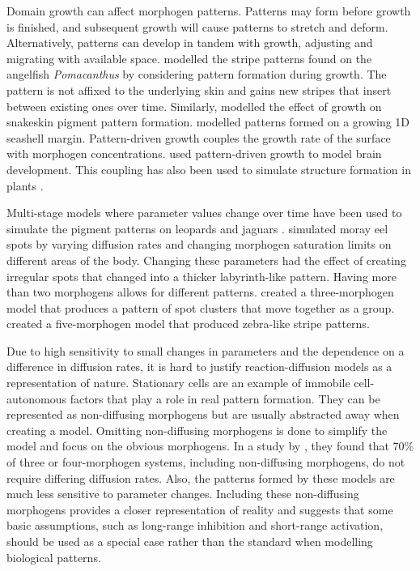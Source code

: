 Domain growth can affect morphogen patterns. Patterns may form before growth is finished, and subsequent growth will cause patterns to stretch and deform. Alternatively, patterns can develop in tandem with growth, adjusting and migrating with available space. \citet{kondo1995} modelled the stripe patterns found on the angelfish \textit{Pomacanthus} by considering pattern formation during growth. The pattern is not affixed to the underlying skin and gains new stripes that insert between existing ones over time. Similarly, \citet{murray1991} modelled the effect of growth on snakeskin pigment pattern formation. \citet{fowler1992} modelled patterns formed on a growing 1D seashell margin. Pattern-driven growth couples the growth rate of the surface with morphogen concentrations. \citet{lefevre2010} used pattern-driven growth to model brain development. This coupling has also been used to simulate structure formation in plants \citep{harrison2002, holloway2007}.  

Multi-stage models where parameter values change over time have been used to simulate the pigment patterns on leopards and jaguars \citep{liu2006}. \citet{malheiros2017} simulated moray eel spots by varying diffusion rates and changing morphogen saturation limits on different areas of the body. Changing these parameters had the effect of creating irregular spots that changed into a thicker labyrinth-like pattern. Having more than two morphogens allows for different patterns. \citet{schenk2000} created a three-morphogen model that produces a pattern of spot clusters that move together as a group. \citet{meinhardt1982} created a five-morphogen model that produced zebra-like stripe patterns.

Due to high sensitivity to small changes in parameters and the dependence on a difference in diffusion rates, it is hard to justify reaction-diffusion models as a representation of nature. Stationary cells are an example of immobile cell-autonomous factors that play a role in real pattern formation. They can be represented as non-diffusing morphogens but are usually abstracted away when creating a model. Omitting non-diffusing morphogens is done to simplify the model and focus on the obvious morphogens. In a study by \citet{marcon2016}, they found that 70\% of three or four-morphogen systems, including non-diffusing morphogens, do not require differing diffusion rates. Also, the patterns formed by these models are much less sensitive to parameter changes. Including these non-diffusing morphogens provides a closer representation of reality and suggests that some basic assumptions, such as long-range inhibition and short-range activation, should be used as a special case rather than the standard when modelling biological patterns.